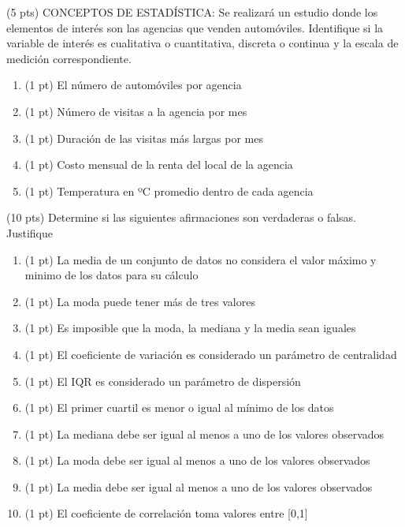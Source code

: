 \documentclass[addpoints]{exam}
\theoremstyle{mytheor}
\begin{document}
  \begin{questions}
  
  \question (5 pts) CONCEPTOS DE ESTADÍSTICA: Se realizará un estudio donde los elementos de interés son las agencias que venden automóviles. Identifique si la variable de interés es cualitativa o cuantitativa, discreta o continua y la escala de medición correspondiente. 
  
  \begin{enumerate}
  \item (1 pt) El número de automóviles por agencia
  \item (1 pt) Número de visitas a la agencia por mes
  \item (1 pt) Duración de las visitas más largas por mes
  \item (1 pt) Costo mensual de la renta del local de la agencia
  \item (1 pt) Temperatura en ºC promedio dentro de cada agencia
  \end{enumerate}
  
  \question (10 pts) Determine si las siguientes afirmaciones son verdaderas o falsas. Justifique
  
  \begin{enumerate}
  \item (1 pt) La media de un conjunto de datos no considera el valor máximo y minimo de los datos para su cálculo
  \item (1 pt) La moda puede tener más de tres valores 
  \item (1 pt) Es imposible que la moda, la mediana y la media sean iguales
  \item (1 pt) El coeficiente de variación es considerado un parámetro de centralidad
  \item (1 pt) El IQR es considerado un parámetro de dispersión
  \item (1 pt) El primer cuartil es menor o igual al mínimo de los datos
  \item (1 pt) La mediana debe ser igual al menos a uno de los valores observados
  \item (1 pt) La moda debe ser igual al menos a uno de los valores observados
  \item (1 pt) La media debe ser igual al menos a uno de los valores observados
  \item (1 pt) El coeficiente de correlación toma valores entre [0,1]
  \end{enumerate}

\end{questions}
\end{document}
